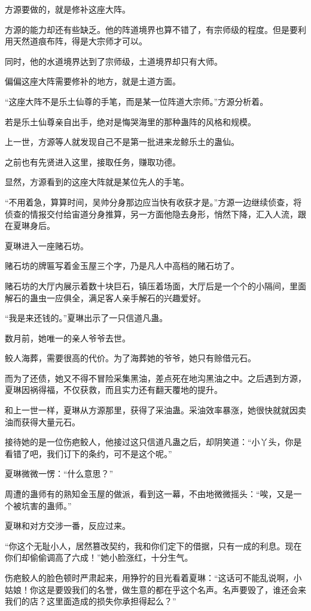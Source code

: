 \begin{this_body}
方源要做的，就是修补这座大阵。

方源的能力却还有些缺乏。他的阵道境界也算不错了，有宗师级的程度。但是要利用天然道痕布阵，得是大宗师才可以。

同时，他的水道境界达到了宗师级，土道境界却只有大师。

偏偏这座大阵需要修补的地方，就是土道方面。

“这座大阵不是乐土仙尊的手笔，而是某一位阵道大宗师。”方源分析着。

若是乐土仙尊亲自出手，绝对是悔哭海里的那种蛊阵的风格和规模。

上一世，方源等人就发现自己不是第一批进来龙鲸乐土的蛊仙。

之前也有先贤进入这里，接取任务，赚取功德。

显然，方源看到的这座大阵就是某位先人的手笔。

“不用着急，算算时间，吴帅分身那边应当快有收获才是。”方源一边继续侦查，将侦查的情报交付给宙道分身推算，另一方面他隐去身形，悄然下降，汇入人流，跟在夏琳身后。

夏琳进入一座赌石坊。

赌石坊的牌匾写着金玉屋三个字，乃是凡人中高档的赌石坊了。

赌石坊的大厅内展示着数十块巨石，镇压着场面，大厅后是一个个的小隔间，里面解石的蛊虫一应俱全，满足客人亲手解石的兴趣爱好。

“我是来还钱的。”夏琳出示了一只信道凡蛊。

数月前，她唯一的亲人爷爷去世。

鲛人海葬，需要很高的代价。为了海葬她的爷爷，她只有赊借元石。

而为了还债，她又不得不冒险采集黑油，差点死在地沟黑油之中。之后遇到方源，夏琳因祸得福，不仅获救，而且实力还有翻天覆地的提升。

和上一世一样，夏琳从方源那里，获得了采油蛊。采油效率暴涨，她很快就就因卖油而获得大量元石。

接待她的是一位伤疤鲛人，他接过这只信道凡蛊之后，却阴笑道：“小丫头，你是看错了吧，我们订下的条约，可不是这个呢。”

夏琳微微一愣：“什么意思？”

周遭的蛊师有的熟知金玉屋的做派，看到这一幕，不由地微微摇头：“唉，又是一个被坑害的蛊师。”

夏琳和对方交涉一番，反应过来。

“你这个无耻小人，居然篡改契约，我和你们定下的借据，只有一成的利息。现在你们却偷偷调高了六成！”她小脸涨红，十分生气。

伤疤鲛人的脸色顿时严肃起来，用狰狞的目光看着夏琳：“这话可不能乱说啊，小姑娘！你这是要毁我们的名誉，做生意的都在乎这个名声。名声要毁了，谁还会来我们的店？这里面造成的损失你承担得起么？”


\end{this_body}
